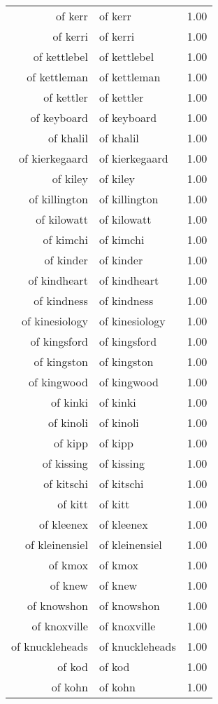 \begin{table}[ht]
\begin{tabular}{rlr}
  of kerr & of kerr & 1.00 \\ 
  of kerri & of kerri & 1.00 \\ 
  of kettlebel & of kettlebel & 1.00 \\ 
  of kettleman & of kettleman & 1.00 \\ 
  of kettler & of kettler & 1.00 \\ 
  of keyboard & of keyboard & 1.00 \\ 
  of khalil & of khalil & 1.00 \\ 
  of kierkegaard & of kierkegaard & 1.00 \\ 
  of kiley & of kiley & 1.00 \\ 
  of killington & of killington & 1.00 \\ 
  of kilowatt & of kilowatt & 1.00 \\ 
  of kimchi & of kimchi & 1.00 \\ 
  of kinder & of kinder & 1.00 \\ 
  of kindheart & of kindheart & 1.00 \\ 
  of kindness & of kindness & 1.00 \\ 
  of kinesiology & of kinesiology & 1.00 \\ 
  of kingsford & of kingsford & 1.00 \\ 
  of kingston & of kingston & 1.00 \\ 
  of kingwood & of kingwood & 1.00 \\ 
  of kinki & of kinki & 1.00 \\ 
  of kinoli & of kinoli & 1.00 \\ 
  of kipp & of kipp & 1.00 \\ 
  of kissing & of kissing & 1.00 \\ 
  of kitschi & of kitschi & 1.00 \\ 
  of kitt & of kitt & 1.00 \\ 
  of kleenex & of kleenex & 1.00 \\ 
  of kleinensiel & of kleinensiel & 1.00 \\ 
  of kmox & of kmox & 1.00 \\ 
  of knew & of knew & 1.00 \\ 
  of knowshon & of knowshon & 1.00 \\ 
  of knoxville & of knoxville & 1.00 \\ 
  of knuckleheads & of knuckleheads & 1.00 \\ 
  of kod & of kod & 1.00 \\ 
  of kohn & of kohn & 1.00 \\ 

\end{tabular}
\end{table}
